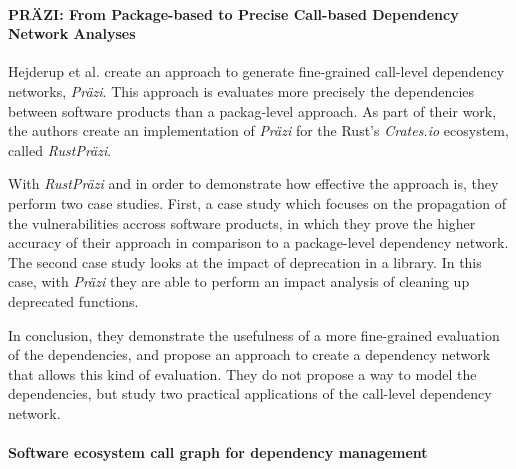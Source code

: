 \paragraph{PRÄZI: From Package-based to Precise Call-based Dependency Network Analyses \cite{hejderup2018prazi}}
Hejderup et al. create an approach to generate fine-grained call-level dependency networks, \textit{Präzi}. This approach is evaluates more precisely the dependencies between software products than a packag-level approach. As part of their work, the authors create an implementation of \textit{Präzi} for the Rust's \textit{Crates.io} ecosystem, called \textit{RustPräzi}.

With \textit{RustPräzi} and in order to demonstrate how effective the approach is, they perform two case studies. First, a case study which focuses on the propagation of the vulnerabilities accross software products, in which they prove the higher accuracy of their approach in comparison to a package-level dependency network. The second case study looks at the impact of deprecation in a library. In this case, with \textit{Präzi} they are able to perform an impact analysis of cleaning up deprecated functions.

In conclusion, they demonstrate the usefulness of a more fine-grained evaluation of the dependencies, and propose an approach to create a dependency network that allows this kind of evaluation. They do not propose a way to model the dependencies, but study two practical applications of the call-level dependency network.

\paragraph{Software ecosystem call graph for dependency management \cite{hejderup2018software}}


